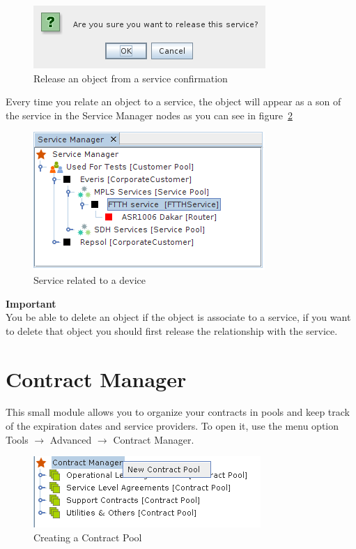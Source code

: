 \documentclass[a4paper]{article}
\begin{document}
	\begin{figure}[h!]
		\centering
		\includegraphics[width=0.5\linewidth]{img/sm_release_from_service_confrimation.png}
		\caption{Release an object from a service confirmation}
		\label{fig:sm_release_from_service_confirmation}
	\end{figure}
	
	Every time you relate an object to a service, the object will appear as a son of the service in the Service Manager nodes as you can see in figure~\ref{fig:sm_device_relate_to_service}
	\begin{figure}[h!]
		\centering
		\includegraphics[width=0.5\linewidth]{img/sm_device_relate_to_service.png}
		\caption{Service related to a device}
		\label{fig:sm_device_relate_to_service}
	\end{figure}
	\begin{framed} {\large \textbf{Important}}\\
		You be able to delete an object if the object is associate to a service, if you want to delete that object you should first release the relationship with the service.
	\end{framed}
	
	
	\newpage
	\section{Contract Manager} \label{sec:contract_manager}
		This small module allows you to organize your contracts in pools and keep track of the expiration dates and service providers. To open it, use the menu option Tools $\rightarrow$ Advanced $\rightarrow$ Contract Manager.
		\begin{figure}[h!]
			\centering
			\includegraphics[width=0.5\linewidth]{img/contract_manager_new_contract_pool.png}
			\caption{Creating a Contract Pool}
			\label{fig:contract_manager_new_contract_pool}
		\end{figure}
		
\end{document}
